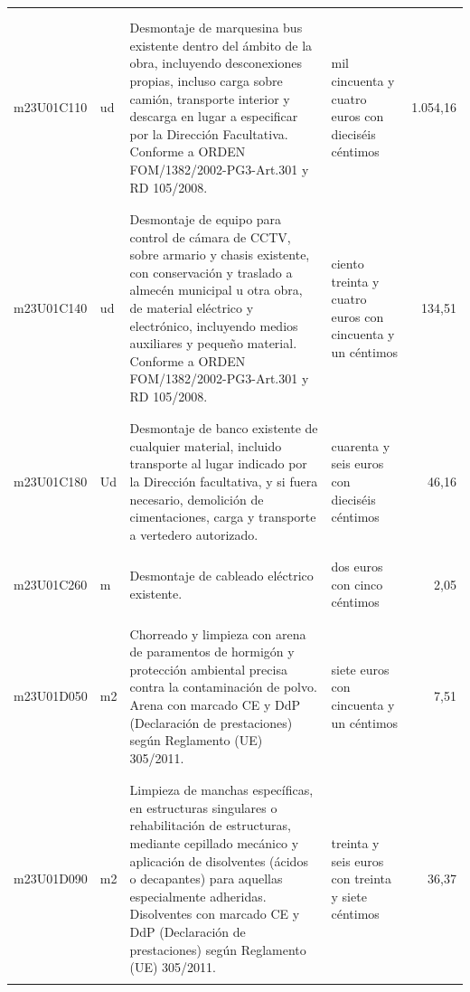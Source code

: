 \documentclass{book}%
\begin{document}
\begin{longtable}{|l|l|p{5cm}|p{3cm}|r|}
&&&&\\%
&&&&\\%
m23U01C110&ud&Desmontaje de marquesina bus existente dentro del ámbito de la obra, incluyendo desconexiones propias, incluso carga sobre camión, transporte interior y descarga en lugar a especificar por la Dirección Facultativa. Conforme a ORDEN FOM/1382/2002{-}PG3{-}Art.301 y RD 105/2008.&mil cincuenta y cuatro euros con dieciséis céntimos&1.054,16\\%
&&&&\\%
&&&&\\%
m23U01C140&ud&Desmontaje de equipo para control de cámara de CCTV, sobre armario y chasis existente, con conservación y traslado a almecén municipal u otra obra, de material eléctrico y electrónico, incluyendo medios auxiliares y pequeño material. Conforme a ORDEN FOM/1382/2002{-}PG3{-}Art.301 y RD 105/2008.&ciento treinta y cuatro euros con cincuenta y un céntimos&134,51\\%
&&&&\\%
&&&&\\%
m23U01C180&Ud&Desmontaje de banco existente de cualquier material, incluido transporte al lugar indicado por la Dirección facultativa, y si fuera necesario, demolición de cimentaciones, carga y transporte a vertedero autorizado.&cuarenta y seis euros con dieciséis céntimos&46,16\\%
&&&&\\%
&&&&\\%
m23U01C260&m&Desmontaje de cableado eléctrico existente.&dos euros con cinco céntimos&2,05\\%
&&&&\\%
&&&&\\%
m23U01D050&m2&Chorreado y limpieza con arena de paramentos de hormigón y protección ambiental precisa contra la contaminación de polvo. Arena con marcado CE y DdP (Declaración de prestaciones) según Reglamento (UE) 305/2011.&siete euros con cincuenta y un céntimos&7,51\\%
&&&&\\%
&&&&\\%
m23U01D090&m2&Limpieza de manchas específicas, en estructuras singulares o rehabilitación de estructuras, mediante cepillado mecánico y aplicación de disolventes (ácidos o decapantes) para aquellas especialmente adheridas. Disolventes con marcado CE y DdP (Declaración de prestaciones) según Reglamento (UE) 305/2011.&treinta y seis euros con treinta y siete céntimos&36,37\\%
&&&&\\%

\end{longtable}
\end{document}
